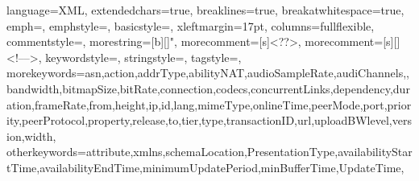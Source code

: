%
\newcommand{\hlinew}[1]{%
  \noalign{\ifnum0=`}\fi\hrule \@height #1 \futurelet
   \reserved@a\@xhline}
%
\def\Mark#1{\raisebox{0pt}[0pt][0pt]{\textsuperscript{\footnotesize\ensuremath{\ifcase#1\or *\or \dagger\or \ddagger\or%
    \mathsection\or \mathparagraph\or \|\or **\or \dagger\dagger%
    \or \ddagger\ddagger \else\textsuperscript{\expandafter\romannumeral#1}\fi}}}}
%
 {
    language=XML,
    extendedchars=true,
    breaklines=true,
    breakatwhitespace=true,
    emph={},
    emphstyle=\color{red},
    basicstyle=\small,
    xleftmargin=17pt,
    columns=fullflexible,
    commentstyle=\color{gray}\upshape,
    morestring=[b][\color{brown}]",
    morecomment=[s]{<?}{?>},
    morecomment=[s][\color{forestgreen}]{<!--}{-->},
    keywordstyle=\color{orangered},
    stringstyle=\ttfamily\color{black},
    tagstyle=\color{blue},
    morekeywords={asn,action,addrType,abilityNAT,audioSampleRate,audiChannels,,bandwidth,bitmapSize,bitRate,connection,codecs,concurrentLinks,dependency,duration,frameRate,from,height,ip,id,lang,mimeType,onlineTime,peerMode,port,priority,peerProtocol,property,release,to,tier,type,transactionID,url,uploadBWlevel,version,width},
    otherkeywords={attribute,xmlns,schemaLocation,PresentationType,availabilityStartTime,availabilityEndTime,minimumUpdatePeriod,minBufferTime,UpdateTime},
}
